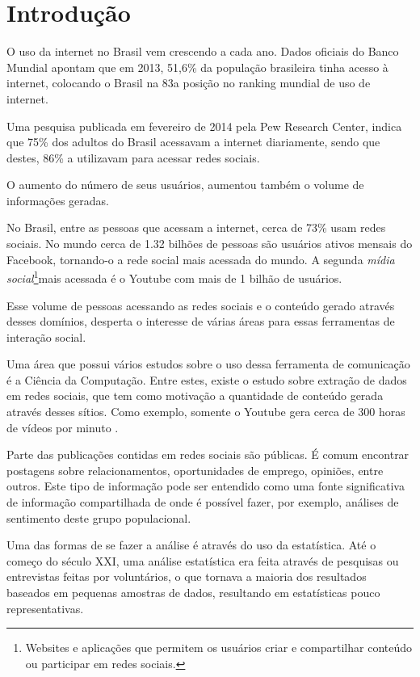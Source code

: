 \chapter{Introdução}
\label{Introducao}
O uso da internet no Brasil vem crescendo a cada ano. Dados oficiais do Banco Mundial apontam que em 2013, 51,6\% da população brasileira tinha acesso à internet, colocando o Brasil na 83a posição no ranking mundial de uso de internet\cite{googlePublicData}.

Uma pesquisa publicada em fevereiro de 2014 pela Pew Research Center\cite{pewPage}, indica que 75\% dos adultos do Brasil acessavam a internet diariamente, sendo que destes, 86\% a utilizavam para acessar redes sociais.
    
O aumento do número de seus usuários, aumentou também o volume de informações geradas.\cite{domoPage} %

No Brasil, entre as pessoas que acessam a internet, cerca de 73\% usam redes sociais\cite{BrasilRedesSociais}. No mundo cerca de 1.32 bilhões de pessoas são usuários ativos mensais do Facebook, tornando-o a rede social mais acessada do mundo\cite{investorFacebook}. A segunda \textit{mídia social}\footnote{Websites e aplicações que permitem os usuários criar e compartilhar conteúdo ou participar em redes sociais.\cite{socialMedia}}mais acessada é o Youtube com mais de 1 bilhão de usuários\cite{estatisticasYoutube}.

Esse volume de pessoas acessando as redes sociais e o conteúdo gerado através desses domínios, desperta o interesse de várias áreas para essas ferramentas de interação social.

Uma área que possui vários estudos sobre o uso dessa ferramenta de comunicação é a Ciência da Computação\cite{Benevenuto}. Entre estes, existe o estudo sobre extração de dados em redes sociais, que tem como motivação a quantidade de conteúdo gerada através desses sítios. Como exemplo, somente o Youtube gera cerca de 300 horas de vídeos por minuto \cite{estatisticasYoutube}.

Parte das publicações contidas em redes sociais são públicas. É comum encontrar postagens sobre relacionamentos, oportunidades de emprego, opiniões, entre outros. Este tipo de informação pode ser entendido como uma fonte significativa de informação compartilhada de onde é possível fazer, por exemplo, análises de sentimento deste grupo populacional.

Uma das formas de se fazer a análise é através do uso da estatística. Até o começo do século XXI, uma análise estatística era feita através de pesquisas ou entrevistas feitas por voluntários, o que tornava a maioria dos resultados baseados em pequenas amostras de dados, resultando em estatísticas pouco representativas\cite{Benevenuto}.

